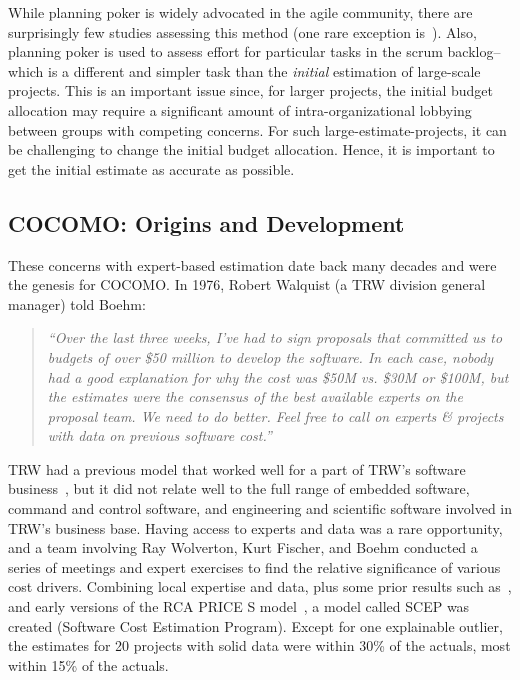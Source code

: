 \documentclass[smallcondesed]{svjour3}
\begin{document}
While planning poker is widely advocated in the agile community,
there are surprisingly few studies assessing this method (one rare exception is~\cite{molokk08}).
Also,   planning poker is used to assess effort
for particular tasks in the scrum backlog-- which is a different and simpler task
than the {\em initial} estimation of  large-scale
projects. This is an important issue since, for larger
projects, the initial budget allocation may require a significant amount of intra-organizational lobbying between groups with competing concerns. For such large-estimate-projects, it can
be challenging to change the initial budget allocation. Hence, it is important to get
the initial estimate as accurate as possible.

 

\subsection{COCOMO: Origins and Development}
These concerns with  expert-based estimation  date
back many decades and were the genesis for  COCOMO. In 1976, Robert Walquist (a TRW division general manager)
told  Boehm: \begin{quote}{\em ``Over the last three
weeks, I've had to sign proposals that committed us
to budgets of over \$50 million to develop the
software.  In each case, nobody had a good
explanation for why the cost was \$50M vs. \$30M or
\$100M, but the estimates were the consensus of the
best available experts on the proposal team.  We
need to do better. Feel free to call on experts
\& projects with data on previous software cost.''}\end{quote}



TRW had a previous model that worked well for a part
of TRW's software business~\cite{wol74}, but it
did not relate well to the full range of embedded
software, command and control software, and
engineering and scientific software involved in
TRW's business base.  Having access to experts and
data was a rare opportunity, and a team involving
Ray Wolverton, Kurt Fischer, and Boehm conducted a
series of meetings and expert exercises to find
the relative significance of various  cost
drivers. Combining local expertise  and data, plus some prior results 
such as~\cite{putnam76,black77,herd77,watson77},  and early versions of the RCA
PRICE S model~\cite{frei79}, a model called SCEP was created (Software Cost
Estimation Program).
Except for
one explainable outlier, the estimates for
 20 projects with solid data were within 30\% of
the actuals, most within 15\% of the actuals.
\end{document}
